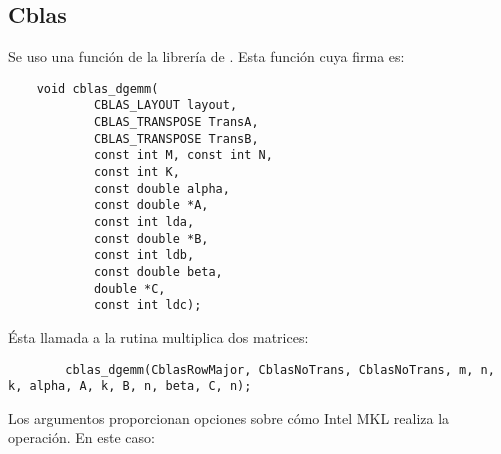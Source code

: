 \subsection{Cblas}
    Se uso una función de la librería  de . Esta función
    cuya firma es:
    \lstset{language=C, numbers=left, tabsize=2, escapeinside=||}
    \begin{lstlisting}
    void cblas_dgemm(
            CBLAS_LAYOUT layout,
            CBLAS_TRANSPOSE TransA,
            CBLAS_TRANSPOSE TransB,
            const int M, const int N,
            const int K,
            const double alpha,
            const double *A,
            const int lda,
            const double *B,
            const int ldb,
            const double beta,
            double *C,
            const int ldc);
    \end{lstlisting}
    Ésta llamada a la rutina  multiplica dos matrices:
    \begin{lstlisting}
        cblas_dgemm(CblasRowMajor, CblasNoTrans, CblasNoTrans, m, n, k, alpha, A, k, B, n, beta, C, n);
    \end{lstlisting}
    Los argumentos proporcionan opciones sobre cómo Intel MKL realiza la
    operación. En este caso: \\
